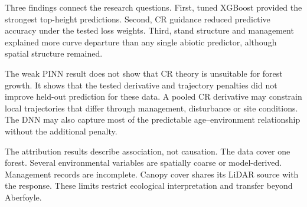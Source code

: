 Three findings connect the research questions. First, tuned XGBoost provided the strongest
top-height predictions. Second, CR guidance reduced predictive accuracy under the tested loss
weights. Third, stand structure and management explained more curve departure than any single
abiotic predictor, although spatial structure remained.

The weak PINN result does not show that CR theory is unsuitable for forest growth. It shows that
the tested derivative and trajectory penalties did not improve held-out prediction for these
data. A pooled CR derivative may constrain local trajectories that differ through management,
disturbance or site conditions. The DNN may also capture most of the predictable age--environment
relationship without the additional penalty.

The attribution results describe association, not causation. The data cover one forest. Several
environmental variables are spatially coarse or model-derived. Management records are incomplete.
Canopy cover shares its LiDAR source with the response. These limits restrict ecological
interpretation and transfer beyond Aberfoyle.


